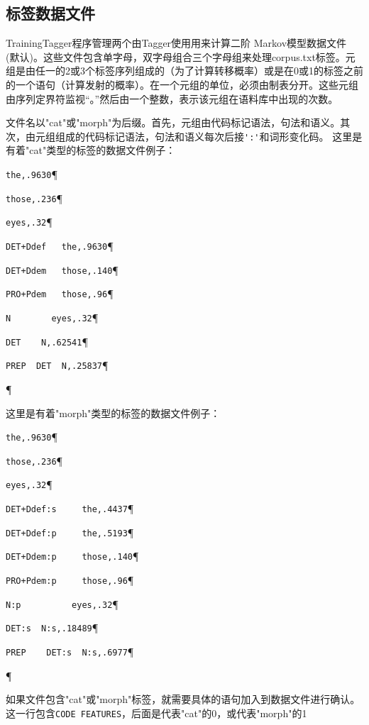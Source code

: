 \subsection{标签数据文件}
\label{section-training-dict}
TrainingTagger程序管理两个由Tagger使用用来计算二阶 Markov模型数据文件 (默认)。这些文件包含单字母，双字母组合三个字母组来处理corpus.txt标签。元组是由任一的2或3个标签序列组成的（为了计算转移概率）或是在0或1的标签之前的一个语句（计算发射的概率）。在一个元组的单位，必须由制表分开。这些元组由序列定界符监视“。”然后由一个整数，表示该元组在语料库中出现的次数。


\bigskip

\noindent
文件名以"cat"或"morph"为后缀。首先，元组由代码标记语法，句法和语义。其次，由元组组成的代码标记语法，句法和语义每次后接\verb+':'+和词形变化码。
这里是有着"cat"类型的标签的数据文件例子：

\bigskip
\verb+the,.9630+\P

\verb+those,.236+\P

\verb+eyes,.32+\P

\verb$DET+Ddef	 the,.9630$\P

\verb$DET+Ddem	 those,.140$\P

\verb$PRO+Pdem	 those,.96$\P

\verb+N		   eyes,.32+\P

\verb+DET	 N,.62541+\P

\verb+PREP	DET  N,.25837+\P

\P

\bigskip

\noindent 这里是有着"morph"类型的标签的数据文件例子：


\bigskip
\verb+the,.9630+\P

\verb+those,.236+\P

\verb+eyes,.32+\P

\verb$DET+Ddef:s	 the,.4437$\P

\verb$DET+Ddef:p	 the,.5193$\P

\verb$DET+Ddem:p	 those,.140$\P

\verb$PRO+Pdem:p	 those,.96$\P

\verb+N:p		   eyes,.32+\P

\verb+DET:s	 N:s,.18489+\P

\verb+PREP	  DET:s  N:s,.6977+\P

\P

\bigskip
\noindent
如果文件包含"cat"或"morph"标签，就需要具体的语句加入到数据文件进行确认。
这一行包含\verb+CODE FEATURES+，后面是代表"cat"的0，或代表"morph"的1

